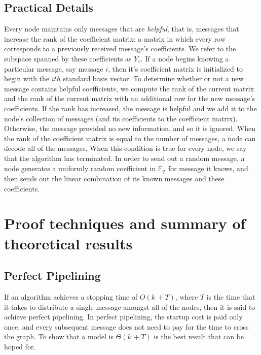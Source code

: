 \documentclass{article} %
\def\numMessages{\textit{k}\,}
\def\fieldSize{\textit{q}\,}
\begin{document}
\subsection{Practical Details}
Every node maintains only messages that are \textit{helpful}, that is, messages that increase the rank of the coefficient matrix: a matrix in which every row corresponds to a previously received message's coefficients. We refer to the subspace spanned by these coefficients as $Y_v$. If a node begins knowing a particular message, say message $i$, then it's coefficient matrix is initialized to begin with the $ith$ standard basis vector. To determine whether or not a new message contains helpful coefficients, we compute the rank of the current matrix and the rank of the current matrix with an additional row for the new message's coefficients. If the rank has increased, the message is helpful and we add it to the node's collection of messages (and its coefficients to the coefficient matrix). Otherwise, the message provided no new information, and so it is ignored. When the rank of the coefficient matrix is equal to the number of messages, a node can decode all of the messages. When this condition is true for every node, we say that the algorithm has terminated. In order to send out a random message, a node generates a uniformly random coefficient in $\mathbb{F}_{\fieldSize}$ for message it knows, and then sends out the linear combination of its known messages and these coefficients.

\section{Proof techniques and summary of theoretical results}
\subsection{Perfect Pipelining}
If an algorithm achieves a stopping time of $O(\numMessages + T)$, where $T$ is the time that it takes to distribute a single message amongst all of the nodes, then it is said to achieve perfect pipelining. In perfect pipelining, the startup cost is paid only once, and every subsequent message does not need to pay for the time to cross the graph. To show that a model is $\Theta(\numMessages + T)$ is the best result that can be hoped for.
\end{document}
